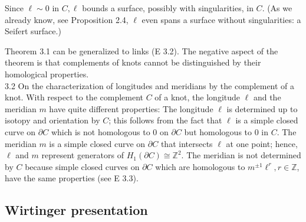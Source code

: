 \documentclass[10pt, letterpaper]{article}
\begin{document}
Since $\ell \sim 0$ in $C, \ell$ bounds a surface, possibly with singularities, in $C$. (As we already know, see Proposition 2.4, $\ell$ even spans a surface without singularities: a Seifert surface.)

Theorem 3.1 can be generalized to links (E 3.2). The negative aspect of the theorem is that complements of knots cannot be distinguished by their homological properties.\\
3.2 On the characterization of longitudes and meridians by the complement of a knot. With respect to the complement $C$ of a knot, the longitude $\ell$ and the meridian $m$ have quite different properties: The longitude $\ell$ is determined up to isotopy and orientation by $C$; this follows from the fact that $\ell$ is a simple closed curve on $\partial C$ which is not homologous to 0 on $\partial C$ but homologous to 0 in $C$. The meridian $m$ is a simple closed curve on $\partial C$ that intersects $\ell$ at one point; hence, $\ell$ and $m$ represent generators of $H_{1}(\partial C) \cong \mathbb{Z}^{2}$. The meridian is not determined by $C$ because simple closed curves on $\partial C$ which are homologous to $m^{ \pm 1} \ell^{r}, r \in \mathbb{Z}$, have the same properties (see E 3.3).



\subsection{Wirtinger presentation}
\end{document}
